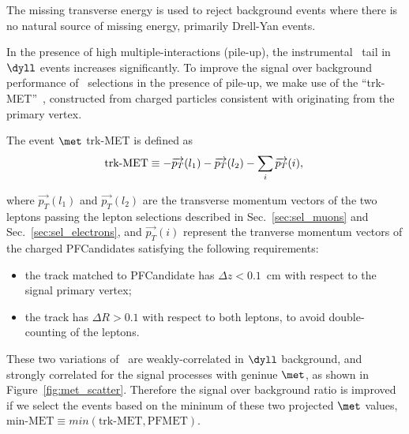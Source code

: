 
The missing transverse energy is used to reject background events
where there is no natural source of missing energy, primarily Drell-Yan events. 

In the presence of high multiple-interactions (pile-up), the instrumental \met\ tail in 
$\dyll$ events increases significantly.  To improve the signal over background performance of \met\ selections 
in the presence of pile-up, we make use of the ``trk-MET''~\cite{trkMET}, constructed from 
charged particles consistent with originating from the primary vertex. 

The event $\met$ trk-MET is defined as 
\begin{equation}
\text{trk-MET} \equiv -\overrightarrow{p_T}(l_1) - \overrightarrow{p_T}(l_2) - \sum_i{\overrightarrow{p_T}(i)}, \\
\label{eq:trkmet}
\end{equation}

where $\overrightarrow{p_T}(l_1)$ and $\overrightarrow{p_T}(l_2)$ are the transverse momentum vectors of the two 
leptons passing the lepton selections described in Sec.~\ref{sec:sel_muons} and Sec.~\ref{sec:sel_electrons}, 
and $\overrightarrow{p_T}(i)$ represent the tranverse momentum vectors of the charged PFCandidates satisfying the following requirements:
\begin{itemize}
\item the track matched to PFCandidate has $\Delta z < 0.1$~cm with respect to the signal primary vertex;
\item the track has $\Delta R > 0.1$ with respect to both leptons, to avoid double-counting of the leptons.
\end{itemize}


These two variations of \met\ are weakly-correlated in $\dyll$ background, and 
strongly correlated for the signal processes with geninue $\met$, as shown in Figure~\ref{fig:met_scatter}. 
Therefore the signal over background ratio is improved if we select the events 
based on the mininum of these two projected $\met$ values, $\text{min-MET} \equiv min(\text{trk-MET}, \text{PFMET})$. 


